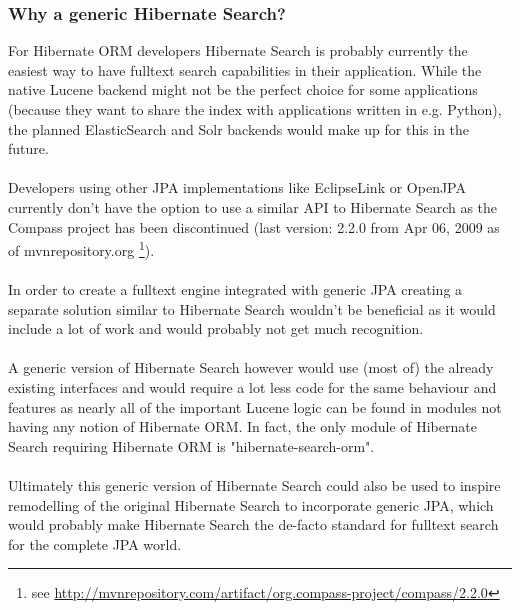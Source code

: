 \pagebreak

\subsubsection{Why a generic Hibernate Search?}

For Hibernate ORM developers Hibernate Search is probably currently the easiest way to have fulltext search capabilities in their application. While the native Lucene backend might not be the perfect choice for some applications (because they want to share the index with applications written in e.g. Python), the planned ElasticSearch and Solr backends would make up for this in the future.
\\\\
Developers using other JPA implementations like EclipseLink or OpenJPA currently don't have the option to use a similar API to Hibernate Search as the Compass project has been discontinued (last version: 2.2.0 from Apr 06, 2009 as of mvnrepository.org \footnote{see \url{http://mvnrepository.com/artifact/org.compass-project/compass/2.2.0}}).
\\\\
In order to create a fulltext engine integrated with generic JPA creating a separate solution similar to Hibernate Search wouldn't be beneficial as it would include a lot of work and would probably not get much recognition.
\\\\
A generic version of Hibernate Search however would use (most of) the already existing interfaces and would require a lot less code for the same behaviour and features as nearly all of the important Lucene logic can be found in modules not having any notion of Hibernate ORM. In fact, the only module of Hibernate Search requiring Hibernate ORM is "hibernate-search-orm".
\\\\
Ultimately this generic version of Hibernate Search could also be used to inspire remodelling of the original Hibernate Search to incorporate generic JPA, which would probably make Hibernate Search the de-facto standard for fulltext search for the complete JPA world.

\pagebreak